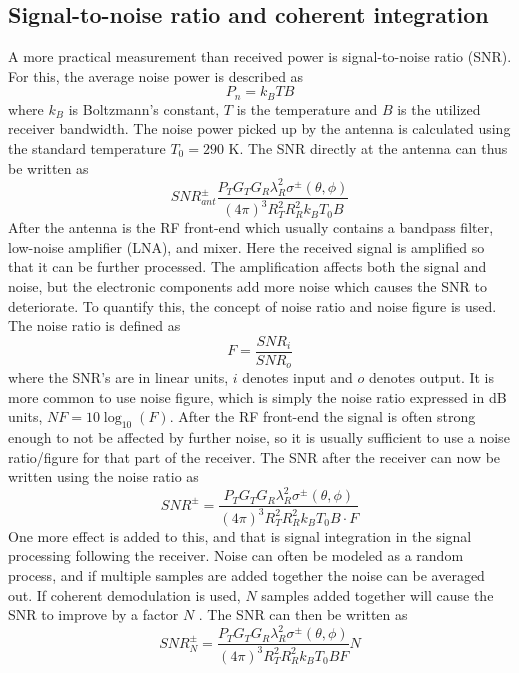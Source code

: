 \documentclass[10pt,a4paper]{eitExjobb}
\begin{document}
	\subsection{Signal-to-noise ratio and coherent integration}
	A more practical measurement than received power is signal-to-noise ratio (SNR). For this, the average noise power is described as \cite{Young2004}
	\begin{equation*}
	P_n = k_B TB
	\end{equation*}
	where $k_B$ is Boltzmann's constant, $T$ is the temperature and $B$ is the utilized receiver bandwidth. The noise power picked up by the antenna is calculated using the standard temperature $T_0 = 290$ K. The SNR directly at the antenna can thus be written as
	\begin{equation*}
	\mathit{SNR}^\pm_{ant} \frac{P_T G_T G_R \lambda_R^2 \sigma^\pm (\theta,\phi)}{(4\pi)^3 R_T^2 R_R^2 k_B T_0 B}
	\end{equation*}
	After the antenna is the RF front-end which usually contains a bandpass filter, low-noise amplifier (LNA), and mixer. Here the received signal is amplified so that it can be further processed. The amplification affects both the signal and noise, but the electronic components add more noise which causes the SNR to deteriorate. To quantify this, the concept of noise ratio and noise figure is used. The noise ratio is defined as \cite{Young2004}
	\begin{equation*}
	F = \frac{\mathit{SNR}_i}{\mathit{SNR}_o}
	\end{equation*}
	where the SNR's are in linear units, $i$ denotes input and $o$ denotes output. It is more common to use noise figure, which is simply the noise ratio expressed in dB units, $\mathit{NF} = 10\log_{10}(F)$. After the RF front-end the signal is often strong enough to not be affected by further noise, so it is usually sufficient to use a noise ratio/figure for that part of the receiver. The SNR after the receiver can now be written using the noise ratio as
	\begin{equation*}
	\mathit{SNR}^\pm = \frac{P_T G_T G_R \lambda_R^2 \sigma^\pm (\theta,\phi)}{(4\pi)^3 R_T^2 R_R^2 k_B T_0 B \cdot F}
	\end{equation*}
	One more effect is added to this, and that is signal integration in the signal processing following the receiver. Noise can often be modeled as a random process, and if multiple samples are added together the noise can be averaged out. If coherent demodulation is used, $N$ samples added together will cause the SNR to improve by a factor $N$ \cite{Richards2012}. The SNR can then be written as
	\begin{equation*}
	\textit{SNR}^\pm_N = \frac{P_T G_T G_R \lambda_R^2 \sigma^\pm (\theta,\phi)}{(4\pi)^3 R_T^2 R_R^2 k_B T_0 B F} N
	\end{equation*}
	
\end{document}
